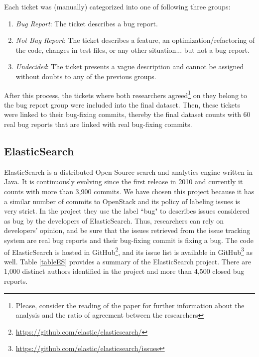 \documentclass[a4paper, 12pt]{book}
\begin{document}
Each ticket was (manually) categorized into one of following three groups:
\begin{enumerate}
  \item \textit{Bug Report}: The ticket describes a bug report.
  \item \textit{Not Bug Report}: The ticket describes a feature, an optimization/refactoring of the code, changes in test files, or any other situation... but not a bug report.
  \item \textit{Undecided}: The ticket presents a vague description and cannot be assigned without doubts to any of the previous groups.
\end{enumerate}

After this process, the tickets where both researchers agreed\footnote{Please, consider the reading of the paper for further information about the analysis and the ratio of agreement between the researchers} on they belong to the bug report group were included into the final dataset. Then, these tickets were linked to their bug-fixing commits, thereby the final dataset counts with 60 real bug reports that are linked with real bug-fixing commits.

\subsection{ElasticSearch}
ElasticSearch is a distributed Open Source search and analytics engine written in Java. It is continuously evolving since the first release in 2010 and currently it counts with more than 3,900 commits. We have chosen this project because it has a similar number of commits to OpenStack and its policy of labeling issues is very strict. In the project they use the label ``bug" to describes issues considered as bug by the developers of ElasticSearch. Thus, researchers can rely on developers' opinion, and be sure that the issues retrieved from the issue tracking system are real bug reports and their bug-fixing commit is fixing a bug. The code of ElasticSearch is hosted in GitHub\footnote{\url{https://github.com/elastic/elasticsearch/}}, and its issue list is available in GitHub\footnote{\url{https://github.com/elastic/elasticsearch/issues}} as well. Table \ref{tableES} provides a summary of the ElasticSearch project. There are 1,000 distinct authors identified in the project and more than 4,500 closed bug reports. 
\end{document}
